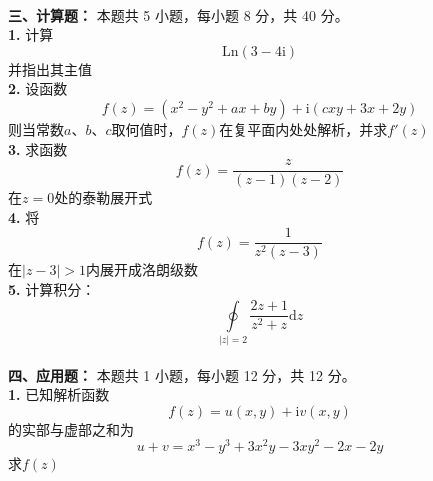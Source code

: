 \documentclass[14pt,a4paper,UTF8]{ctexart}
\begin{document}
    \\
    \textbf{三、计算题：} 本题共 5 小题，每小题 8 分，共 40 分。\\
	\textbf{1. } 计算
    $$
    \mathrm{Ln}\left(3-4\mathrm{i}\right)
    $$
    并指出其主值
	\\[20pt]
	\textbf{2. } 设函数
    $$
    f\left(z\right)=\left(x^2-y^2+ax+by\right)+\mathrm{i}\left(cxy+3x+2y\right)
    $$
    则当常数$a$、$b$、$c$取何值时，$f\left(z\right)$在复平面内处处解析，并求$f'\left(z\right)$
	\\[20pt]
    \textbf{3. } 求函数
    $$
    f\left(z\right)=\frac{z}{\left(z-1\right)\left(z-2\right)}
    $$
    在$z=0$处的泰勒展开式
	\\[20pt]
	\textbf{4. } 将
    $$
    f\left(z\right)=\frac{1}{z^2\left(z-3\right)}
    $$
    在$\left| z-3 \right|>1$内展开成洛朗级数
	\\[20pt]
	\textbf{5. } 计算积分：
    $$
    \oint\limits_{\left| z \right|=2}{\frac{2z+1}{z^2+z}\mathrm{d}z}
    $$
	\\
    \textbf{四、应用题：} 本题共 1 小题，每小题 12 分，共 12 分。\\
    \textbf{1. } 已知解析函数
    $$
    f\left(z\right)=u\left(x,y\right)+\mathrm{i}v\left(x,y\right)
    $$
    的实部与虚部之和为
    $$
    u+v=x^3-y^3+3x^2y-3xy^2-2x-2y
    $$
    求$f\left(z\right)$
\end{document}

